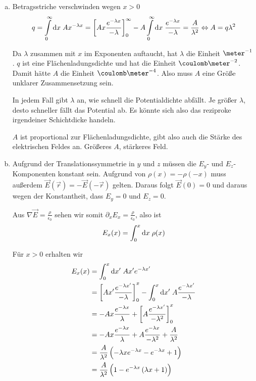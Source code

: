 \documentclass[a4paper,german,12pt,smallheadings]{scrartcl}
\begin{document}
\begin{enumerate}[a)]
\item
  Betragsstriche verschwinden wegen $x > 0$
  \begin{equation}
    q = \int\limits_0^\infty \dif x \; Ax^{-\lambda x} =
    \sbr[3]{A x \frac{e^{-\lambda x}}{-\lambda}}_0^\infty -
    A \int\limits_0^\infty \dif x \; \frac{e^{-\lambda x}}{-\lambda} = \frac{A}{\lambda^2} \Leftrightarrow A = q \lambda^2
  \end{equation}

  Da $\lambda$ zusammen mit $x$ im Exponenten auftaucht, hat $\lambda$ die
  Einheit $\meter^{-1}$. $q$ ist eine Flächenladungsdichte und hat die
  Einheit $\coulomb\meter^{-2}$. Damit hätte $A$ die Einheit
  $\coulomb\meter^{-4}$. Also muss $A$ eine Größe unklarer Zusammensetzung
  sein.

  In jedem Fall gibt $\lambda$ an, wie schnell die Potentialdichte abfällt. Je
  größer $\lambda$, desto schneller fällt das Potential ab. Es könnte sich also
  das reziproke irgendeiner Schichtdicke handeln.

  $A$ ist proportional zur Flächenladungsdichte, gibt also auch die Stärke des
  elektrischen Feldes an. Größeres $A$, stärkeres Feld.
\item
  Aufgrund der Translationssymmetrie in $y$ und $z$ müssen die $E_y$- und
  $E_z$-Komponenten konstant sein. Aufgrund von $\rho(x) = -\rho(-x)$ muss
  außerdem $\vec{E}(\vec{r}) = -\vec{E}(-\vec{r})$ gelten. Daraus folgt
  $\vec{E}(0) = 0$ und daraus wegen der Konstantheit, dass $E_y = 0$ und $E_z =
  0$.

  Aus $\nabla \vec{E} = \frac{\rho}{\epsilon_0}$ sehen wir somit $\partial_x E_x
  = \frac{\rho}{\epsilon_0}$, also ist
  \begin{equation}
    E_x(x) = \int_0^x \dif x \; \rho(x)
  \end{equation}

  Für $x > 0$ erhalten wir
  \begin{align}
    E_x(x) &= \int_0^x \dif x' \; A x' e^{-\lambda x'} \\
    &= \sbr[3]{A x' \frac{e^{- \lambda x'}}{-\lambda}}_0^x - \int_0^x \dif x' \; A \frac{e^{- \lambda x'}}{-\lambda} \\
    &= -A x \frac{e^{- \lambda x}}{\lambda} + \sbr[3]{ A \frac{e^{- \lambda x'}}{-\lambda^2}}_0^x \\
    &= -A x \frac{e^{- \lambda x}}{\lambda} + A \frac{e^{- \lambda x}}{-\lambda^2} + \frac{A}{\lambda^2} \\
    &= \frac{A}{\lambda^2} \del{-\lambda x e^{-\lambda x} - e^{-\lambda x} + 1} \\
    &= \frac{A}{\lambda^2} \del{1 - e^{-\lambda x}\del{\lambda x + 1}}
  \end{align}


\end{enumerate}
\end{document}
